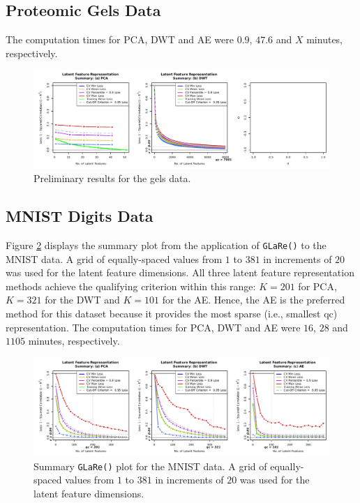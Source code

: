 \subsection{Proteomic Gels Data}\label{sec:gels-reults}

The computation times for PCA, DWT and AE were $0.9$, $47.6$ and {\color{purple}$X$} minutes, respectively.


\begin{figure}
    \centering
    \includegraphics[width=1\linewidth]{figures/gels-results.pdf}
    \caption{Preliminary results for the gels data.}
    \label{fig:enter-label}
\end{figure}


\subsection{MNIST Digits Data}\label{sec:mnist-reults}

Figure \ref{fig:mnist-results} displays the summary plot from the application of \texttt{GLaRe()} to the MNIST data.
A grid of equally-spaced values from $1$ to $381$ in increments of $20$ was used for the latent feature dimensions.
All three latent feature representation methods achieve the qualifying criterion within this range: $K = 201$ for PCA, $K = 321$ for the DWT and $K = 101$ for the AE.
Hence, the AE is the preferred method for this dataset because it provides the most sparse (i.e., smallest qc) representation.
The computation times for PCA, DWT and AE were $16$, $28$ and $1105$ minutes, respectively.

\begin{figure}
    \centering
    \includegraphics[width=1\textwidth]{figures/mnist-results.pdf}
    \caption{Summary \texttt{GLaRe()} plot for the MNIST data. A grid of equally-spaced values from $1$ to $381$ in increments of $20$ was used for the latent feature dimensions.}
    \label{fig:mnist-results}
\end{figure}

